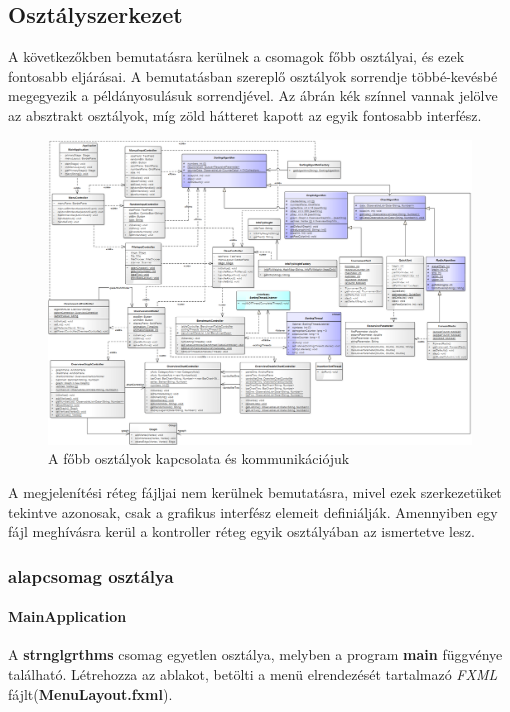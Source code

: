 \documentclass{elteikthesis}
\newcommand{\hiddenparagraph}[1]{
	\stepcounter{paragraph}
	\paragraph*{{#1}}
}
\begin{document}
\subsection{Osztályszerkezet}
A következőkben bemutatásra kerülnek a csomagok főbb osztályai, és ezek fontosabb eljárásai. A bemutatásban szereplő osztályok sorrendje többé-kevésbé megegyezik a példányosulásuk sorrendjével. Az ábrán kék színnel vannak jelölve az absztrakt osztályok, míg zöld hátteret kapott az egyik fontosabb interfész.\par
\begin{figure}[H]
	\centering
	\includegraphics[width=\textwidth]{pics/plan_class.png}
	\caption{A főbb osztályok kapcsolata és kommunikációjuk}
\end{figure}
A megjelenítési réteg fájljai nem kerülnek bemutatásra, mivel ezek szerkezetüket tekintve azonosak, csak a grafikus interfész elemeit definiálják. Amennyiben egy fájl meghívásra kerül a kontroller réteg egyik osztályában az ismertetve lesz.
\subsubsection{alapcsomag osztálya}
\hiddenparagraph{MainApplication}
A \textbf{strnglgrthms} csomag egyetlen osztálya, melyben a program \textbf{main} függvénye található. Létrehozza az ablakot, betölti a menü elrendezését tartalmazó \emph{FXML} fájlt(\textbf{MenuLayout.fxml}).
\end{document}
